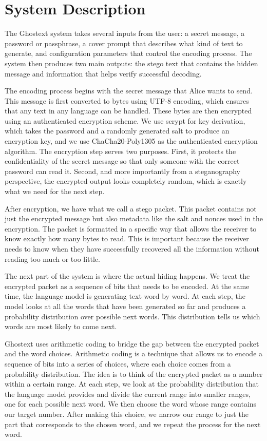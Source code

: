 \documentclass[sigconf,review,anonymous]{acmart}
\begin{document}
\section{System Description}

The Ghostext system takes several inputs from the user: a secret message, a password or passphrase, a cover prompt that describes what kind of text to generate, and configuration parameters that control the encoding process. The system then produces two main outputs: the stego text that contains the hidden message and information that helps verify successful decoding.

The encoding process begins with the secret message that Alice wants to send. This message is first converted to bytes using UTF-8 encoding, which ensures that any text in any language can be handled. These bytes are then encrypted using an authenticated encryption scheme. We use scrypt for key derivation, which takes the password and a randomly generated salt to produce an encryption key, and we use ChaCha20-Poly1305 as the authenticated encryption algorithm. The encryption step serves two purposes. First, it protects the confidentiality of the secret message so that only someone with the correct password can read it. Second, and more importantly from a steganography perspective, the encrypted output looks completely random, which is exactly what we need for the next step.

After encryption, we have what we call a stego packet. This packet contains not just the encrypted message but also metadata like the salt and nonces used in the encryption. The packet is formatted in a specific way that allows the receiver to know exactly how many bytes to read. This is important because the receiver needs to know when they have successfully recovered all the information without reading too much or too little.

The next part of the system is where the actual hiding happens. We treat the encrypted packet as a sequence of bits that needs to be encoded. At the same time, the language model is generating text word by word. At each step, the model looks at all the words that have been generated so far and produces a probability distribution over possible next words. This distribution tells us which words are most likely to come next.

Ghostext uses arithmetic coding to bridge the gap between the encrypted packet and the word choices. Arithmetic coding is a technique that allows us to encode a sequence of bits into a series of choices, where each choice comes from a probability distribution. The idea is to think of the encrypted packet as a number within a certain range. At each step, we look at the probability distribution that the language model provides and divide the current range into smaller ranges, one for each possible next word. We then choose the word whose range contains our target number. After making this choice, we narrow our range to just the part that corresponds to the chosen word, and we repeat the process for the next word.
\end{document}
